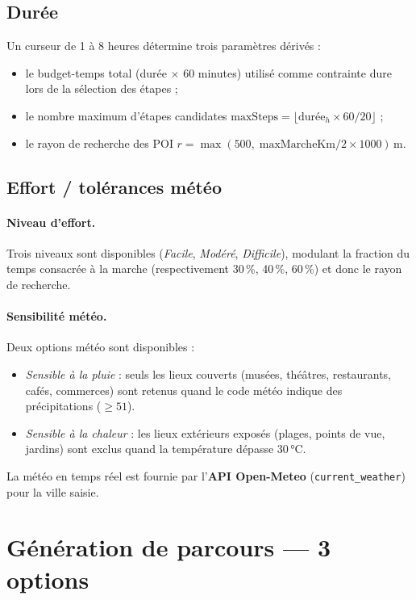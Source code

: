 \documentclass[a4paper,11pt]{article}
\begin{document}
\subsection{Durée}
Un curseur de 1 à 8 heures détermine trois paramètres dérivés :
\begin{itemize}[leftmargin=1.5em]
  \item le budget-temps total (durée $\times$ 60 minutes) utilisé comme
        contrainte dure lors de la sélection des étapes ;
  \item le nombre maximum d'étapes candidates
        $\text{maxSteps} = \lfloor\text{durée}_{h} \times 60 / 20\rfloor$ ;
  \item le rayon de recherche des POI
        $r = \max(500,\; \text{maxMarcheKm}/2 \times 1000)$\,m.
\end{itemize}

\subsection{Effort / tolérances météo}

\paragraph{Niveau d'effort.}
Trois niveaux sont disponibles (\textit{Facile}, \textit{Modéré},
\textit{Difficile}), modulant la fraction du temps consacrée à la marche
(respectivement 30\,\%, 40\,\%, 60\,\%) et donc le rayon de recherche.

\paragraph{Sensibilité météo.}
Deux options météo sont disponibles :
\begin{itemize}[leftmargin=1.5em]
  \item \textit{Sensible à la pluie} : seuls les lieux couverts (musées,
        théâtres, restaurants, cafés, commerces) sont retenus quand
        le code météo indique des précipitations ($\geq 51$).
  \item \textit{Sensible à la chaleur} : les lieux extérieurs exposés
        (plages, points de vue, jardins) sont exclus quand
        la température dépasse 30\,°C.
\end{itemize}
La météo en temps réel est fournie par l'\textbf{API Open-Meteo}
(\texttt{current\_weather}) pour la ville saisie.

\section{Génération de parcours — 3 options}
\end{document}
